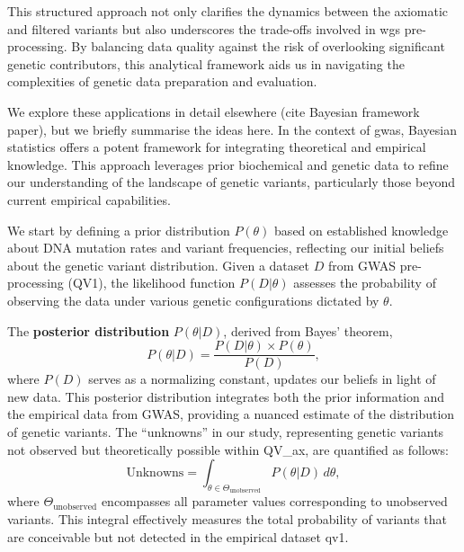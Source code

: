 This structured approach not only clarifies the dynamics between the axiomatic and filtered variants but also underscores the trade-offs involved in \ac{wgs} pre-processing. 
By balancing data quality against the risk of overlooking significant genetic contributors, this analytical framework aids us in navigating the complexities of genetic data preparation and evaluation.

We explore these applications in detail elsewhere (cite Bayesian framework paper), but we briefly summarise the ideas here. 
In the context of \ac{gwas}, Bayesian statistics offers a potent framework for integrating theoretical and empirical knowledge. 
This approach leverages prior biochemical and genetic data to refine our understanding of the landscape of genetic variants, particularly those beyond current empirical capabilities.

We start by defining a prior distribution \( P(\theta) \) based on established knowledge about DNA mutation rates and variant frequencies, reflecting our initial beliefs about the genetic variant distribution. Given a dataset \( D \) from GWAS pre-processing (QV1), the likelihood function \( P(D|\theta) \) assesses the probability of observing the data under various genetic configurations dictated by \( \theta \).

The \textbf{posterior distribution} \( P(\theta|D) \), derived from Bayes' theorem,
$$P(\theta|D) = \frac{P(D|\theta) \times P(\theta)}{P(D)},$$
where \( P(D) \) serves as a normalizing constant, updates our beliefs in light of new data. This posterior distribution integrates both the prior information and the empirical data from GWAS, providing a nuanced estimate of the distribution of genetic variants.
The ``unknowns'' in our study, representing genetic variants not observed but theoretically possible within QV\_ax, are quantified as follows:
$$
\text{Unknowns} = \int_{\theta \in \Theta_{\text{unobserved}}} P(\theta|D) \, d\theta,
$$
where \( \Theta_{\text{unobserved}} \) encompasses all parameter values corresponding to unobserved variants. 
This integral effectively measures the total probability of variants that are conceivable but not detected in the empirical dataset \ac{qv}1.

